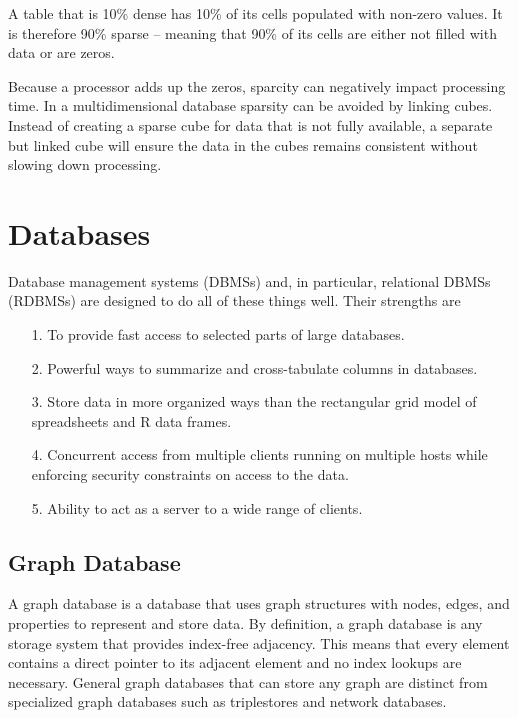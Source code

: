 \documentclass[12pt]{article}
\begin{document}
A table that is 10\% dense has 10\% of its cells populated with non-zero values. It is therefore 90\% sparse – meaning that 90\% of its cells are either not filled with data or are zeros.

Because a processor adds up the zeros, sparcity can negatively impact processing time. In a multidimensional database sparsity can be avoided by linking cubes. Instead of creating a sparse cube for data that is not fully available, a separate but linked cube will ensure the data in the cubes remains consistent without slowing down processing.



\section{Databases}
Database management systems (DBMSs) and, in particular, relational DBMSs (RDBMSs)
are designed to do all of these things well. Their strengths are

\begin{itemize}
\item[1.] To provide fast access to selected parts of large databases.
\item[2.] Powerful ways to summarize and cross-tabulate columns in databases.
\item[3.] Store data in more organized ways than the rectangular grid model of spreadsheets and R
data frames.
\item[4.] Concurrent access from multiple clients running on multiple hosts while enforcing security
constraints on access to the data.
\item[5.] Ability to act as a server to a wide range of clients.
\end{itemize}


\subsection{Graph Database}
A graph database is a database that uses graph structures with nodes, edges, and properties to represent and store data. By definition, a graph database is any storage system that provides index-free adjacency. This means that every element contains a direct pointer to its adjacent element and no index lookups are necessary. General graph databases that can store any graph are distinct from specialized graph databases such as triplestores and network databases.
\end{document}
